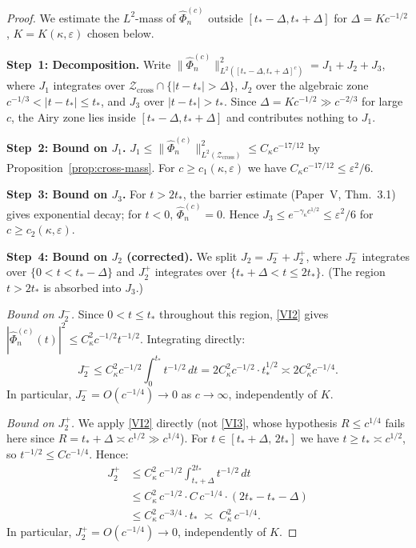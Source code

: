 \documentclass[12pt,a4paper]{amsart}
\theoremstyle{definition}
\theoremstyle{remark}
\newcommand{\Zcross}{\mathcal{Z}_{\mathrm{cross}}}
\begin{document}
\begin{proof}
We estimate the $L^2$-mass of $\widehat{\Phi}_n^{(c)}$
outside $[t_* - \Delta, t_* + \Delta]$
for $\Delta = K c^{-1/2}$, $K = K(\kappa,\varepsilon)$
chosen below.

\textbf{Step~1: Decomposition.}
Write
$\|\widehat{\Phi}_n^{(c)}\|_{L^2([t_*-\Delta, t_*+\Delta]^c)}^2
= J_1 + J_2 + J_3$,
where $J_1$ integrates over $\Zcross \cap \{|t-t_*|>\Delta\}$,
$J_2$ over the algebraic zone
$c^{-1/3} < |t-t_*| \le t_*$,
and $J_3$ over $|t-t_*| > t_*$.
Since $\Delta = Kc^{-1/2} \gg c^{-2/3}$ for large $c$,
the Airy zone lies inside $[t_*-\Delta, t_*+\Delta]$
and contributes nothing to $J_1$.

\textbf{Step~2: Bound on $J_1$.}
$J_1 \le \|\widehat{\Phi}_n^{(c)}\|^2_{L^2(\Zcross)}
\le C_\kappa c^{-17/12}$
by Proposition~\ref{prop:cross-mass}.
For $c \ge c_1(\kappa,\varepsilon)$ we have
$C_\kappa c^{-17/12} \le \varepsilon^2/6$.

\textbf{Step~3: Bound on $J_3$.}
For $t > 2t_*$, the barrier estimate
(Paper~V, Thm.~3.1) gives exponential decay;
for $t < 0$, $\widehat{\Phi}_n^{(c)} = 0$.
Hence $J_3 \le e^{-\gamma_\kappa c^{1/2}} \le \varepsilon^2/6$
for $c \ge c_2(\kappa,\varepsilon)$.

\textbf{Step~4: Bound on $J_2$ (corrected).}
We split $J_2 = J_2^- + J_2^+$, where
$J_2^-$ integrates over $\{0 < t < t_* - \Delta\}$
and $J_2^+$ integrates over $\{t_* + \Delta < t \le 2t_*\}$.
(The region $t > 2t_*$ is absorbed into $J_3$.)

\textit{Bound on $J_2^-$.}
Since $0 < t \le t_*$ throughout this region,
\eqref{VI2} gives
$|\widehat{\Phi}_n^{(c)}(t)|^2 \le C_\kappa^2 c^{-1/2} t^{-1/2}$.
Integrating directly:
\[
J_2^-
\le C_\kappa^2 c^{-1/2}
\int_0^{t_*} t^{-1/2}\,dt
= 2C_\kappa^2 c^{-1/2} \cdot t_*^{1/2}
\asymp 2C_\kappa^2 c^{-1/4}.
\]
In particular, $J_2^- = O(c^{-1/4}) \to 0$
as $c \to \infty$, independently of $K$.

\textit{Bound on $J_2^+$.}
We apply \eqref{VI2} directly (not \eqref{VI3},
whose hypothesis $R \le c^{1/4}$ fails here
since $R = t_* + \Delta \asymp c^{1/2} \gg c^{1/4}$).
For $t \in [t_* + \Delta,\, 2t_*]$ we have
$t \ge t_* \asymp c^{1/2}$,
so $t^{-1/2} \le C c^{-1/4}$.
Hence:
\begin{align*}
J_2^+
&\le C_\kappa^2\, c^{-1/2}
\int_{t_*+\Delta}^{2t_*} t^{-1/2}\,dt \\
&\le C_\kappa^2\, c^{-1/2} \cdot C\, c^{-1/4}
\cdot (2t_* - t_* - \Delta) \\
&\le C_\kappa^2\, c^{-3/4} \cdot t_*
\;\asymp\; C_\kappa^2\, c^{-1/4}.
\end{align*}
In particular, $J_2^+ = O(c^{-1/4}) \to 0$,
independently of $K$.


\end{proof}
\end{document}
